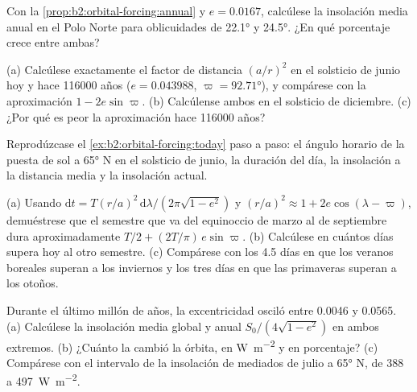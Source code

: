 \begin{exercise}[$\star$]\label{exo:b2:orbital-forcing:4}
Con la \cref{prop:b2:orbital-forcing:annual} y $e = 0.0167$, calcúlese la insolación media anual en
el Polo Norte para oblicuidades de \ang{22.1} y \ang{24.5}. ¿En qué porcentaje crece entre
ambas?
\end{exercise}

\begin{exercise}[$\star\star$]\label{exo:b2:orbital-forcing:5}
(a) Calcúlese exactamente el factor de distancia $(a/r)^2$ en el solsticio de junio hoy y hace \num{116000}
años ($e = 0.043988$, $\varpi = \ang{92.71}$), y compárese con la aproximación $1 -
2e\sin\varpi$. (b) Calcúlense ambos en el solsticio de diciembre. (c) ¿Por qué es peor la aproximación hace \num{116000}
años?
\end{exercise}

\begin{exercise}[$\star\star$]\label{exo:b2:orbital-forcing:6}
Reprodúzcase el \cref{ex:b2:orbital-forcing:today} paso a paso: el ángulo horario de la puesta de sol a \ang{65} N
en el solsticio de junio, la duración del día, la insolación a la distancia media y la
insolación actual.
\end{exercise}

\begin{exercise}[$\star\star$]\label{exo:b2:orbital-forcing:7}
(a) Usando $\mathrm dt = T(r/a)^2\,\mathrm d\lambda/(2\pi\sqrt{1 - e^2})$ y $(r/a)^2 \approx 1 +
2e\cos(\lambda - \varpi)$, demuéstrese que el semestre que va del equinoccio de marzo al de septiembre dura
aproximadamente $T/2 + (2T/\pi)\,e\sin\varpi$. (b) Calcúlese en cuántos días supera hoy al otro semestre.
(c) Compárese con los 4.5 días en que los veranos boreales superan a los inviernos y los tres días en que
las primaveras superan a los otoños.
\end{exercise}

\begin{exercise}[$\star\star$]\label{exo:b2:orbital-forcing:8}
Durante el último millón de años, la excentricidad osciló entre \num{0.0046} y \num{0.0565}. (a) Calcúlese
la insolación media global y anual $S_0/(4\sqrt{1 - e^2})$ en ambos extremos. (b) ¿Cuánto la cambió la órbita, en
\unit{W.m^{-2}} y en porcentaje? (c) Compárese con el intervalo de la
insolación de mediados de julio a \ang{65} N, de 388 a \qty{497}{W.m^{-2}}.
\end{exercise}

